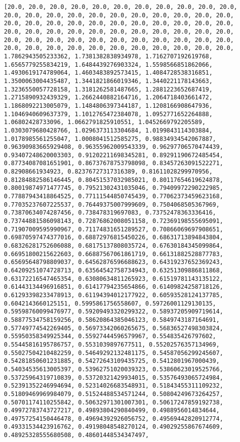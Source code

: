 \documentclass[11pt]{article}
\begin{document}
\begin{Verbatim}[commandchars=\\\{\}]
[20.0, 20.0, 20.0, 20.0, 20.0, 20.0, 20.0, 20.0, 20.0, 20.0, 20.0, 20.0, 20.0, 20.0, 20.0, 20.0, 20.0, 20.0, 20.0, 20.0, 20.0, 20.0, 20.0, 20.0, 20.0, 20.0, 20.0, 20.0, 20.0, 20.0, 20.0, 20.0, 20.0, 20.0, 20.0, 20.0, 20.0, 20.0, 20.0, 20.0, 20.0, 20.0, 20.0, 20.0, 20.0, 20.0, 20.0, 20.0, 20.0, 20.0, 20.0, 20.0, 20.0, 20.0, 20.0, 20.0, 20.0, 20.0, 20.0, 20.0, 20.0, 20.0, 20.0, 20.0, 20.0, 20.0, 1.7862943505233362, 1.7381382838934978, 1.7162707192619768, 1.6565779255834219, 1.6484439276903324, 1.5598566851862066, 1.4930619174789064, 1.4603483892573415, 1.4084728538316851, 1.3500063004435487, 1.3441821866019346, 1.3440221178143663, 1.3236550057728158, 1.3181262581487665, 1.2881223652687419, 1.2715890932439329, 1.2662440882164716, 1.2064718403661472, 1.1868092213005079, 1.1484806397344187, 1.1208166908647936, 1.1046940609637379, 1.1012765472384078, 1.0952771652264888, 1.06802428733096, 1.0662791825910551, 1.0452669792205589, 1.0303079680428766, 1.0296373113304684, 1.0199843114303884, 1.0178985561255047, 1.0008041512585275, 0.98834934542067887, 0.96390983665929408, 0.96355962009543339, 0.96297706570474439, 0.93407248620003303, 0.91202211698345281, 0.89291190672485454, 0.87734087081651901, 0.86737678753798098, 0.83457263091522271, 0.82908661934923, 0.82376727317316389, 0.81611028299970956, 0.81284882586146445, 0.80451537032985021, 0.80117654619624878, 0.80019874971477745, 0.79521302431035046, 0.79409972290222985, 0.77887943418864525, 0.77111544850745439, 0.77062373459623168, 0.77035237607225537, 0.76449375007999609, 0.7504068505367969, 0.73870634074287456, 0.738478319697083, 0.73752478363336416, 0.73744881586098143, 0.72876862008051158, 0.72369198555695091, 0.71907009595990967, 0.71174831651289527, 0.70866069697908651, 0.69870597474377016, 0.68872976815450226, 0.68631713894843804, 0.68326281752606088, 0.68175137808035724, 0.67630184345099864, 0.66951800215622603, 0.66887567061861719, 0.66131882528877783, 0.65695648798809037, 0.64562876596688623, 0.64319237652369243, 0.64209251074728713, 0.63564542758734943, 0.63251309886811868, 0.63172216547465354, 0.63080634811265923, 0.61519781143135122, 0.61443134496916851, 0.61417794235654866, 0.61409824258718126, 0.61293398233478913, 0.61194394012177922, 0.60593528124137785, 0.6042143660125151, 0.5995861756558607, 0.59726001129130135, 0.59598760099476977, 0.59209493320299322, 0.58937205909719614, 0.58877534758159256, 0.58620864385046123, 0.5849743187164691, 0.57749774542269405, 0.56973342060265675, 0.56836527498303824, 0.55950358349925344, 0.55927444596579967, 0.554835426797602, 0.55445816195786757, 0.5531039897677511, 0.55202576357134969, 0.55027504210482259, 0.54649292132481175, 0.54587056299245607, 0.54281850601231885, 0.54272643109435725, 0.5412801967000439, 0.54034535613005397, 0.53962751020039323, 0.53860623019525766, 0.53725964319710839, 0.53720321429934015, 0.53576493065724984, 0.52391352246994694, 0.52314026683548931, 0.51843455311109232, 0.51809469969984079, 0.51524488534571244, 0.50804249673264257, 0.50701174110255842, 0.50632971301007301, 0.50617247859192738, 0.49972783743727217, 0.49893804290840499, 0.4988956014834644, 0.49757254150446478, 0.49694392926056752, 0.49569442820912774, 0.49331534423916762, 0.49198048548270124, 0.49029255867674609, 0.48925328555680508, 0.48601448534347497, 
\end{Verbatim}
\end{document}
